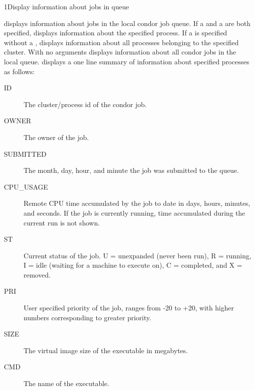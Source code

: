 \begin{ManPage}{}{1}{Display information about jobs in queue}
\label{man-condor-q}
\Synopsis {}
  
  

\Description
{} displays information about jobs in the local condor job queue.
If a  and a  are both specified, 
displays information about the specified process. If a  is
specified without a ,  displays information about
all processes belonging to the specified cluster. With no arguments
 displays information about all condor jobs in the local queue.
 displays a one line summary of information about specified
processes as follows:

\begin{description}
\item[ID] The cluster/process id of the condor job. 
\item[OWNER] The owner of the job. 
\item[SUBMITTED] The month, day, hour, and minute the job was submitted to the queue. 
\item[CPU\_USAGE] Remote CPU time accumulated by the job to date in days, hours, minutes, and seconds.
If the job is currently running, time accumulated during the current run is not shown. 
\item[ST] Current status of the job. U = unexpanded (never been run), R = running, I = idle (waiting for a machine to execute
     on), C = completed, and X = removed. 
\item[PRI] User specified priority of the job, ranges from -20 to +20, with higher numbers corresponding to greater priority. 
\item[SIZE] The virtual image size of the executable in megabytes. 
\item[CMD] The name of the executable. 
\end{description}

\begin{Options}
\end{Options}

\end{ManPage}
